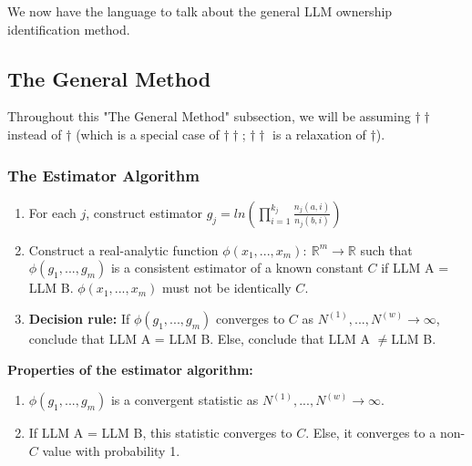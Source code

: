 \documentclass{article}
\begin{document}
We now have the language to talk about the general LLM ownership identification method.



\subsection{The General Method}
\begin{mdframed}
Throughout this "The General Method" subsection, we will be assuming $\dagger\dagger$ instead of $\dagger$ (which is a special case of $\dagger\dagger$; $\dagger\dagger$ is a relaxation of $\dagger$).
\end{mdframed}

\subsubsection{The Estimator Algorithm}
\begin{enumerate}
\item For each $\displaystyle j$, construct estimator $\displaystyle g_{j} =ln\left(\prod _{i=1}^{k_{j}}\frac{n_{j}\left( a,i\right)}{n_{j}\left( b,i\right)}\right)$
\item Construct a real-analytic function $\displaystyle \phi \left( x_{1} ,...,x_{m}\right) :\ \mathbb{R}^{m}\rightarrow \mathbb{R}$ such that $\displaystyle \phi \left( g_{1} ,...,g_{m}\right)$ is a consistent estimator of a known constant $\displaystyle C$ if LLM A = LLM B. $\displaystyle \phi \left( x_{1} ,...,x_{m}\right)$ must not be identically $\displaystyle C$.
\item \textbf{Decision rule:} If $\displaystyle \phi \left( g_{1} ,...,g_{m}\right)$ converges to $\displaystyle C$ as $\displaystyle N^{\left( 1\right)} ,...,N^{\left( w\right)}\rightarrow \infty $, conclude that LLM A = LLM B. Else, conclude that LLM A $\displaystyle \neq $LLM B.
\end{enumerate}



\textbf{Properties of the estimator algorithm:}
\begin{enumerate}
\item  $\displaystyle \phi \left( g_{1} ,...,g_{m}\right)$ is a convergent statistic as $\displaystyle N^{\left( 1\right)} ,...,N^{\left( w\right)}\rightarrow \infty $.
\item If LLM A = LLM B, this statistic converges to $\displaystyle C$. Else, it converges to a non-$\displaystyle C$ value with probability 1.
\end{enumerate}
\end{document}
